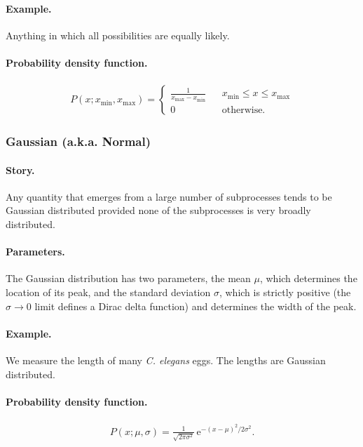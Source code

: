 \paragraph{Example.} Anything in which all possibilities are equally
likely.
\paragraph{Probability density function.}
\begin{align}
P(x;x_\mathrm{min}, x_\mathrm{max}) = \left\{ \begin{array}{ccc}
\frac{1}{x_\mathrm{max} - x_\mathrm{min}} & & x_\mathrm{min} \le x \le x_\mathrm{max} \\[0.5em]
0 & & \text{otherwise.}
\end{array}
\right.
\end{align}



\subsubsection{Gaussian  (a.k.a. Normal)}
\paragraph{Story.} Any quantity that emerges from a large number of
subprocesses tends to be Gaussian distributed provided none of the
subprocesses is very broadly distributed.
\paragraph{Parameters.} The Gaussian distribution has two parameters,
the mean $\mu$, which determines the location of its peak, and the
standard deviation $\sigma$, which is strictly positive (the
$\sigma\to 0$ limit defines a Dirac delta function) and determines the
width of the peak.
\paragraph{Example.} We measure the length of many \textit{C. elegans}
eggs.  The lengths are Gaussian distributed.
\paragraph{Probability density function.}
\begin{align}
P(x;\mu, \sigma) = \frac{1}{\sqrt{2\pi \sigma^2}}\,\mathrm{e}^{-(x-\mu)^2/2\sigma^2}.
\end{align}
